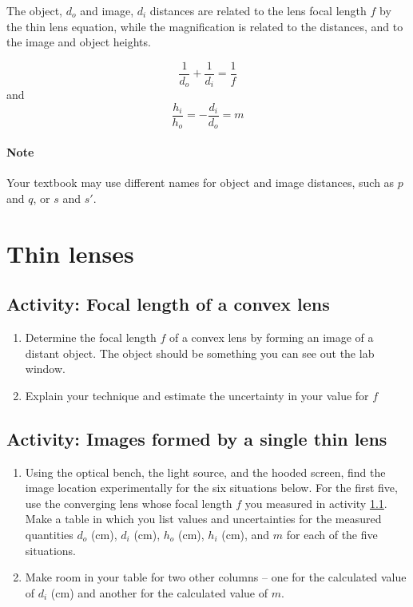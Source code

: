 \begin{multicols}{2}
The object, $d_o$ and image, $d_i$ distances are related to the lens focal length $f$ by the thin lens equation, while the magnification is related to the distances, and to the image and object heights.

\begin{equation} \label{e:thin}
	\frac{1}{d_o} + \frac{1}{d_i} = \frac{1}{f}
\end{equation}
and
\begin{equation} \label{e:thinmag}
	\frac{h_i}{h_o} = -\frac{d_i}{d_o} = m
\end{equation}

\paragraph{Note} Your textbook may use different names for object and image distances, such as $p$ and $q$, or $s$ and $s'$.

\section {Thin lenses}
\subsection{Activity: Focal length of a convex lens}\label{s:focal}
\begin{enumerate}[leftmargin=*] 
	\item Determine the focal length $f$ of a convex lens by forming an image of a distant object.  The object should be something you can see out the lab window.
	\item Explain your technique and estimate the uncertainty in your value for $f$
\end{enumerate}

\subsection{Activity: Images formed by a single thin lens}\label{s:thinlens}
\begin{enumerate}[leftmargin=*] 
	\item Using the optical bench, the light source, and the hooded screen, find the image location experimentally for the six situations below. For the first five, use the converging lens whose focal length $f$ you measured in activity \ref{s:focal}. Make a table in which you list values and uncertainties for the measured quantities $d_o$ (cm), $d_i$ (cm), $h_o$ (cm), $h_i$ (cm), and  $m$ for each of the five situations.
	\item Make room in your table for two other columns -- one for the calculated value of $d_i$ (cm) and another for the calculated value of $m$.
\end{enumerate}
	

\end{multicols}
